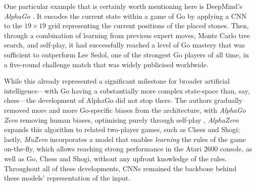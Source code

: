 One particular example that is certainly worth mentioning here is DeepMind's \emph{AlphaGo} \citep{silver2016mastering}. It encodes the current state within a game of Go by applying a CNN to the $19\times 19$ grid representing the current positions of the placed stones. Then, through a combination of learning from previous expert moves, Monte Carlo tree search, and self-play, it had successfully reached a level of Go mastery that was sufficient to outperform Lee Sedol, one of the strongest Go players of all time, in a five-round challenge match that was widely publicised worldwide. 

While this already represented a significant milestone for broader artificial intelligence---with Go having a substantially more complex state-space than, say, chess---the development of AlphaGo did not stop there. The authors gradually removed more and more Go-specific biases from the architecture, with \emph{AlphaGo Zero} removing human biases, optimising purely through self-play \citep{silver2017mastering}, \emph{AlphaZero} expands this algorithm to related two-player games, such as Chess and Shogi; lastly, \emph{MuZero} \citep{schrittwieser2020mastering} incorporates a model that enables \emph{learning} the rules of the game on-the-fly, which allows reaching strong performance in the Atari 2600 console, as well as Go, Chess and Shogi, without any upfront knowledge of the rules. Throughout all of these developments, CNNs remained the backbone behind these models' representation of the input.

